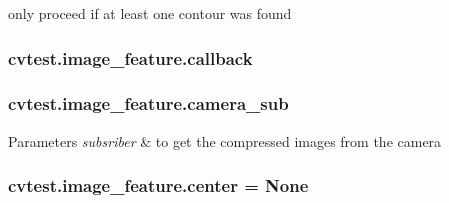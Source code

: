 only proceed if at least one contour was found 

\subsubsection[{\texorpdfstring{callback}{callback}}]{\setlength{\rightskip}{0pt plus 5cm}cvtest.\+image\+\_\+feature.\+callback\hspace{0.3cm}{\ttfamily [static]}}\hypertarget{classcvtest_1_1image__feature_a4e12423b98aa2b60b41f8594c1d6e99b}{}\label{classcvtest_1_1image__feature_a4e12423b98aa2b60b41f8594c1d6e99b}
\subsubsection[{\texorpdfstring{camera\+\_\+sub}{camera_sub}}]{\setlength{\rightskip}{0pt plus 5cm}cvtest.\+image\+\_\+feature.\+camera\+\_\+sub\hspace{0.3cm}{\ttfamily [static]}}\hypertarget{classcvtest_1_1image__feature_ad3e0bf357335dc4e45dacfc8cc6d89f0}{}\label{classcvtest_1_1image__feature_ad3e0bf357335dc4e45dacfc8cc6d89f0}

\begin{DoxyParams}{Parameters}
{\em subsriber} & to get the compressed images from the camera \\
\hline
\end{DoxyParams}
\subsubsection[{\texorpdfstring{center}{center}}]{\setlength{\rightskip}{0pt plus 5cm}cvtest.\+image\+\_\+feature.\+center = None\hspace{0.3cm}{\ttfamily [static]}}\hypertarget{classcvtest_1_1image__feature_a9522bc98855a5dbdf4515845eb787c76}{}\label{classcvtest_1_1image__feature_a9522bc98855a5dbdf4515845eb787c76}
